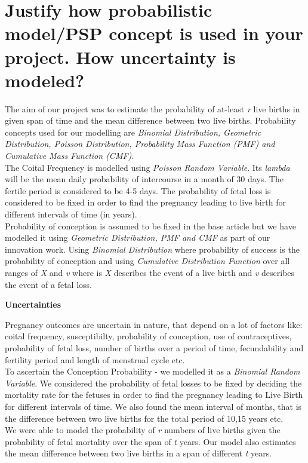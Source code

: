 \documentclass{article}
\begin{document}
\section {Justify how probabilistic model/PSP concept is used in your project. How uncertainty is modeled?}
{The aim of our project was to estimate the probability of at-least {\slshape r} live births in given span of time and the mean difference between two live births. Probability concepts used for our modelling are {\slshape Binomial Distribution, Geometric Distribution, Poisson Distribution, Probability Mass Function (PMF) and Cumulative Mass Function (CMF).}\\
The Coital Frequency is modelled using {\slshape Poisson Random Variable}. Its {\slshape lambda} will be the mean daily probability of intercourse in a month of 30 days. The fertile period is considered to be 4-5 days. The probability of fetal loss is considered to be fixed in order to find the pregnancy leading to live birth for different intervals of time (in years). \\
Probability of conception is assumed to be fixed in the base article but we have modelled it using {\slshape Geometric Distribution, PMF and CMF} as part of our innovation work. Using {\slshape Binomial Distribution} where probability of success is the probability of conception and using {\slshape Cumulative Distribution Function} over all ranges of {\slshape X} and {\slshape v} where is {\slshape X} describes the event of a live birth and {\slshape v} describes the event of a fetal loss.}
\begin{center}
	{\large {\bfseries Uncertainties}}
\end{center}
Pregnancy outcomes are uncertain in nature, that depend on a lot of factors like: coital frequency,
susceptibilty,
probability of conception,
use of contraceptives,
probability of fetal loss,
number of births over a period of time,
fecundability and
fertility period and length of menstrual cycle etc. \\
To ascertain the Conception Probability - we modelled it as a {\slshape Binomial Random Variable}.
We considered the probability of fetal losses to be fixed by deciding the mortality rate for the fetuses in order to find the pregnancy leading to Live Birth for different intervals of time. We also found the mean interval of months, that is the difference between two live births for the total period of 10,15 years etc.\\
We were able to model the probability of {\itshape r} numbers of live births given the probability of fetal mortality over the span of {\itshape t} years. Our model also estimates the mean difference between two live births in a span of different {\slshape t} years.
\end{document}
